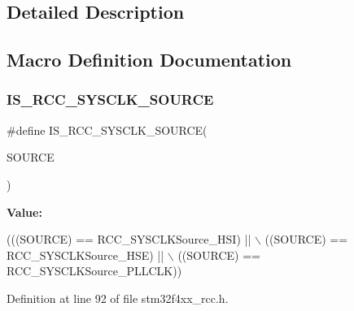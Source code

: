 \subsection{Detailed Description}


\subsection{Macro Definition Documentation}
\mbox{\label{group___r_c_c___system___clock___source_gaae9d6172a72b0a90cb3703aa59258c57}} 
\subsubsection{\texorpdfstring{I\+S\+\_\+\+R\+C\+C\+\_\+\+S\+Y\+S\+C\+L\+K\+\_\+\+S\+O\+U\+R\+CE}{IS\_RCC\_SYSCLK\_SOURCE}}
{\footnotesize\ttfamily \#define I\+S\+\_\+\+R\+C\+C\+\_\+\+S\+Y\+S\+C\+L\+K\+\_\+\+S\+O\+U\+R\+CE(\begin{DoxyParamCaption}\item[{}]{S\+O\+U\+R\+CE }\end{DoxyParamCaption})}

{\bfseries Value\+:}
\begin{DoxyCode}
(((SOURCE) == RCC\_SYSCLKSource\_HSI) || \(\backslash\)
                                      ((SOURCE) == RCC\_SYSCLKSource\_HSE) || \(\backslash\)
                                      ((SOURCE) == RCC\_SYSCLKSource\_PLLCLK))
\end{DoxyCode}


Definition at line 92 of file stm32f4xx\+\_\+rcc.\+h.

